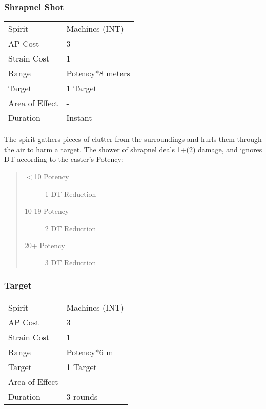 \documentclass[11pt,a4paper,twocolumn]{book}
\begin{document}
\subsubsection*{Shrapnel Shot}
{
	\begin{tabu} to 70mm{| X[l,4] | X[l,7] |}
		\hline
		Spirit         & Machines (INT)        \\
		AP Cost        & 3                     \\
		Strain Cost    & 1                     \\
		Range          & Potency*8 meters \\
		Target         & 1 Target              \\
		Area of Effect & -                     \\
		Duration       & Instant               \\ \hline
	\end{tabu}
	
}

\medskip

The spirit gathers pieces of clutter from the surroundings and hurls them through the air to harm a target. The shower of shrapnel deals 1+(2) damage, and ignores DT according to the caster's Potency: 
\begin{quote}
	\begin{description}
		\item[$<$10 Potency] 	1 DT Reduction
		\item[10-19 Potency] 	2 DT Reduction
		\item[20+ Potency] 		3 DT Reduction
	\end{description}	
\end{quote}


\subsubsection*{Target}
{
	\begin{tabu} to 75mm{| X[l,4] | X[l,7] |}
		\hline
		Spirit 			& Machines (INT) 		\\
		AP Cost	      	& 3 					\\
		Strain Cost     & 1 					\\
		Range     		& Potency*6 m 			\\
		Target      	& 1 Target				\\
		Area of Effect  & - 	 				\\
		Duration     	& 3 rounds				\\ \hline
	\end{tabu}
	
}
\end{document}
